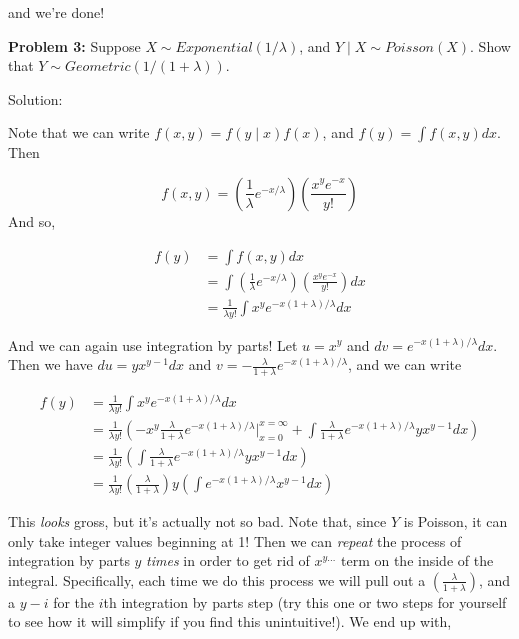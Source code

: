 \documentclass[
  letterpaper,
  DIV=11,
  numbers=noendperiod]{scrreprt}
\begin{document}
and we're done!

\textbf{Problem 3:} Suppose \(X \sim Exponential(1/\lambda)\), and
\(Y \mid X \sim Poisson(X)\). Show that
\(Y \sim Geometric(1/(1 + \lambda))\).

Solution:

Note that we can write \(f(x, y) = f(y \mid x) f(x)\), and
\(f(y) = \int f(x, y) dx\). Then

\[
f(x, y) = \left( \frac{1}{\lambda} e^{-x/\lambda} \right) \left( \frac{x^y e^{-x}}{y!} \right)
\] And so,

\begin{align*}
    f(y) & = \int f(x, y) dx \\
    & = \int \left( \frac{1}{\lambda} e^{-x/\lambda} \right) \left( \frac{x^y e^{-x}}{y!} \right) dx \\
    & = \frac{1}{\lambda y!} \int x^y e^{-x(1 + \lambda)/\lambda} dx
\end{align*}

And we can again use integration by parts! Let \(u = x^y\) and
\(dv = e^{-x(1 + \lambda)/\lambda} dx\). Then we have
\(du = yx^{y-1} dx\) and
\(v = -\frac{\lambda}{1 + \lambda}e^{-x(1 + \lambda)/\lambda}\), and we
can write

\begin{align*}
    f(y) & = \frac{1}{\lambda y!} \int x^y e^{-x(1 + \lambda)/\lambda} dx \\
    & = \frac{1}{\lambda y!} \left( -x^y \frac{\lambda}{1 + \lambda}e^{-x(1 + \lambda)/\lambda} \bigg|_{x = 0}^{x = \infty}  + \int \frac{\lambda}{1 + \lambda}e^{-x(1 + \lambda)/\lambda} yx^{y-1} dx\right) \\
    & = \frac{1}{\lambda y!} \left(  \int \frac{\lambda}{1 + \lambda}e^{-x(1 + \lambda)/\lambda} yx^{y-1} dx \right) \\
    & = \frac{1}{\lambda y!} \left( \frac{\lambda }{1 + \lambda} \right) y \left(  \int e^{-x(1 + \lambda)/\lambda} x^{y-1} dx \right)
\end{align*}

This \emph{looks} gross, but it's actually not so bad. Note that, since
\(Y\) is Poisson, it can only take integer values beginning at 1! Then
we can \emph{repeat} the process of integration by parts \(y\)
\emph{times} in order to get rid of \(x^{y\dots}\) term on the inside of
the integral. Specifically, each time we do this process we will pull
out a \(\left( \frac{\lambda }{1 + \lambda} \right)\), and a \(y - i\)
for the \(i\)th integration by parts step (try this one or two steps for
yourself to see how it will simplify if you find this unintuitive!). We
end up with,
\end{document}
